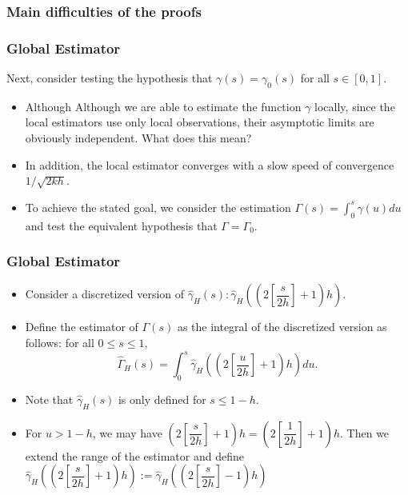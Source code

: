 \documentclass{beamer}
\newcommand{\suit}[1]{\left(#1\right)}
\begin{document}
\begin{frame}
    \frametitle{Main difficulties of the proofs}

    

\end{frame}




\begin{frame}
    \frametitle{Global Estimator}
Next, consider testing the hypothesis that $\gamma(s)=\gamma_0(s)$ for all $s\in [0,1]$.

\bigskip

\begin{itemize}
    \item Although Although we are able to estimate the function $\gamma$ locally, since the local estimators use only local observations, their asymptotic limits are obviously independent. {\color{red} What does this mean?}
    \item In addition, the local estimator converges with a slow speed of convergence $1/\sqrt{2kh}$.
    \item  To achieve the stated goal, we consider the estimation $\Gamma(s)=\int_{0}^{s}\gamma(u)du$ and test the equivalent hypothesis that $\Gamma=\Gamma_0$.
\end{itemize}
\end{frame}

\begin{frame}
    \frametitle{Global Estimator}

    \begin{itemize}
        \item      Consider a discretized version of $\hat{\gamma}_H(s): \hat{\gamma}_H\suit{(2[\dfrac{s}{2h}]+1)h}$.
        \smallskip
        \item      Define the estimator of $\Gamma(s)$ as the integral of the discretized version as follows: for all $0\le s\le 1$,
        $$
        \hat{\Gamma}_{H}(s)=\int_{0}^{s} \hat{\gamma}_{H}\left(\left(2\left[\frac{u}{2 h}\right]+1\right) h\right) d u.
        $$
        \smallskip
        \item Note that $\hat{\gamma}_H(s)$ is only defined for $s\le 1-h$.
        \smallskip
        \item For $u>1-h$, we may have $(2[\dfrac{s}{2h}]+1)h=(2[\dfrac{1}{2h}]+1)h$. Then we extend the range of the estimator and define $\hat{\gamma}_H((2[\dfrac{s}{2h}]+1)h):=\hat{\gamma}_H((2[\dfrac{s}{2h}]-1)h)$
    \end{itemize}


\end{frame}
\end{document}
